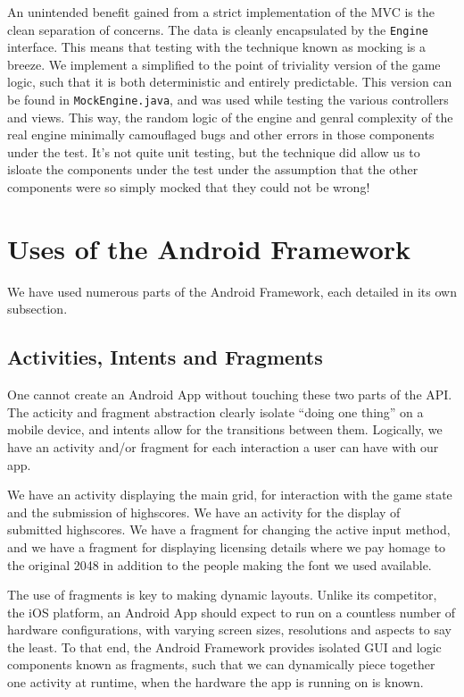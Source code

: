 \documentclass[a4paper, 12pt]{article}
\newcommand{\code}[1]{\texttt{#1}}
\begin{document}
An unintended benefit gained from a strict implementation of the MVC
is the clean separation of concerns. The data is cleanly encapsulated
by the \code{Engine} interface. This means that testing with the
technique known as mocking is a breeze. We implement a simplified to
the point of triviality version of the game logic, such that it is
both deterministic and entirely predictable. This version can be found
in \code{MockEngine.java}, and was used while testing the various
controllers and views. This way, the random logic of the engine and
genral complexity of the real engine minimally camouflaged bugs and
other errors in those components under the test. It's not quite unit
testing, but the technique did allow us to isloate the components
under the test under the assumption that the other components were so
simply mocked that they could not be wrong!

\section{Uses of the Android Framework}

We have used numerous parts of the Android Framework, each detailed in
its own subsection.

\subsection{Activities, Intents and Fragments}
One cannot create an Android App without touching these two parts of
the API. The acticity and fragment abstraction clearly isolate ``doing
one thing'' on a mobile device, and intents allow for the transitions
between them. Logically, we have an activity and/or fragment for each
interaction a user can have with our app.

We have an activity displaying the main grid, for interaction with the
game state and the submission of highscores. We have an activity for
the display of submitted highscores. We have a fragment for changing
the active input method, and we have a fragment for displaying
licensing details where we pay homage to the original 2048 in addition
to the people making the font we used available.

The use of fragments is key to making dynamic layouts. Unlike its
competitor, the iOS platform, an Android App should expect to run on a
countless number of hardware configurations, with varying screen
sizes, resolutions and aspects to say the least. To that end, the
Android Framework provides isolated GUI and logic components known as
fragments, such that we can dynamically piece together one activity at
runtime, when the hardware the app is running on is known.
\end{document}
